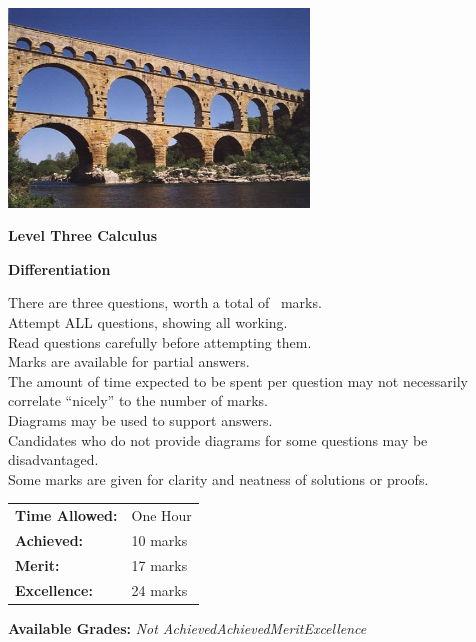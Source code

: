 \documentclass[a4paper,addpoints]{exam}
\begin{document}
\begin{coverpages}

\begin{center}
  \includegraphics[width=0.6\textwidth]{exam-cover-01}

  \vspace{5mm}

  \textbf{\Huge{Level Three Calculus}}

  \vspace{2mm}

  \textbf{\Huge{Differentiation}}
\end{center}

\vspace{5mm}

\noindent
\large{There are three questions, worth a total of \numpoints\ marks.\\
       Attempt ALL questions, showing all working.\\
       Read questions carefully before attempting them.\\
       Marks are available for partial answers.\\
       The amount of time expected to be spent per question may not necessarily correlate ``nicely'' to the number of marks.\\
       Diagrams may be used to support answers.\\
       Candidates who do not provide diagrams for some questions may be disadvantaged.\\
       Some marks are given for clarity and neatness of solutions or proofs.}
\vspace{2mm}

\begin{tabular}{ll}
  \textbf{Time Allowed:}& One Hour\\
  \textbf{Achieved:}& 10 marks\\
  \textbf{Merit:}& 17 marks\\
  \textbf{Excellence:}& 24 marks
\end{tabular}

\vfill

\begin{center}
  \gradetable[h][questions]
  \vspace{2mm}

  \textbf{Available Grades:} \textit{Not Achieved}\quad\textit{Achieved}\quad\textit{Merit}\quad\textit{Excellence}
\end{center}

\end{coverpages}
\end{document}
